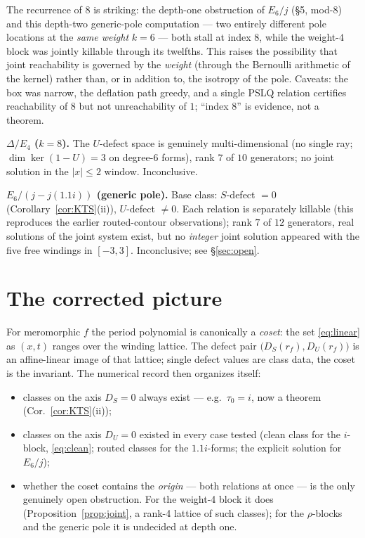 \documentclass[11pt]{article}
\theoremstyle{definition}
\theoremstyle{remark}
\begin{document}
The recurrence of $8$ is striking: the depth-one obstruction of $E_6/j$ (\S5, mod-$8$)
and this depth-two generic-pole computation --- two entirely different pole locations at
the \emph{same weight} $k=6$ --- both stall at index $8$, while the weight-$4$ block was
jointly killable through its twelfths.  This raises the possibility that joint
reachability is governed by the \emph{weight} (through the Bernoulli arithmetic of the
kernel) rather than, or in addition to, the isotropy of the pole.  Caveats: the box was
narrow, the deflation path greedy, and a single PSLQ relation certifies reachability of
$8$ but not unreachability of $1$; ``index $8$'' is evidence, not a theorem.

\smallskip
\noindent\textbf{$\Delta/E_4$ ($k=8$).}  The $U$-defect space is genuinely
multi-dimensional (no single ray; $\dim\ker(1-U)=3$ on degree-$6$ forms), rank $7$ of
$10$ generators; no joint solution in the $|x|\le2$ window.  Inconclusive.

\smallskip
\noindent\textbf{$E_6/(j-j(1.1i))$ (generic pole).}  Base class: $S$-defect $=0$
(Corollary~\ref{cor:KTS}(ii)), $U$-defect $\ne0$.  Each relation is separately killable
(this reproduces the earlier routed-contour observations); rank $7$ of $12$ generators,
real solutions of the joint system exist, but no \emph{integer} joint solution appeared
with the five free windings in $[-3,3]$.  Inconclusive; see \S\ref{sec:open}.

\section{The corrected picture}\label{sec:picture}

For meromorphic $f$ the period polynomial is canonically a \emph{coset}: the set
\eqref{eq:linear} as $(x,t)$ ranges over the winding lattice.  The defect pair
$\big(D_S(r_f),D_U(r_f)\big)$ is an affine-linear image of that lattice; single defect
values are class data, the coset is the invariant.  The numerical record then organizes
itself:

\begin{itemize}
\item classes on the axis $D_S=0$ always exist --- e.g.\ $\tau_0=i$, now a theorem
(Cor.~\ref{cor:KTS}(ii));
\item classes on the axis $D_U=0$ existed in every case tested (clean class for the
$i$-block, \eqref{eq:clean}; routed classes for the $1.1i$-forms; the explicit solution
for $E_6/j$);
\item whether the coset contains the \emph{origin} --- both relations at once --- is the
only genuinely open obstruction.  For the weight-4 block it does
(Proposition~\ref{prop:joint}, a rank-4 lattice of such classes); for the $\rho$-blocks
and the generic pole it is undecided at depth one.
\end{itemize}
\end{document}
